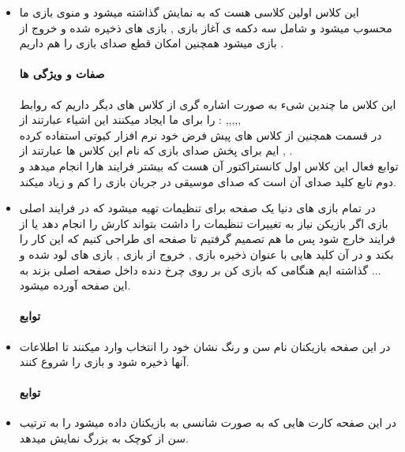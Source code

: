 \documentclass[pdf,titlepage,a4paper]{report}
\begin{document}
\begin{itemize}
		\item {}  این کلاس اولین کلاسی هست که به نمایش گذاشته میشود و منوی بازی ما محسوب میشود و شامل سه دکمه ی آغاز بازی , بازی های ذخیره شده و خروج از بازی میشود همچنین امکان قطع صدای بازی را هم داریم .\\
		\paragraph{صفات و ویژگی ها} 
         این کلاس ما چندین شیء به صورت اشاره گری از کلاس های دیگر داریم که روابط را برای ما ایجاد میکنند این اشیاء عبارتند از :
		,,,,, \\ در قسمت
		همچنین از کلاس های پیش فرض خود نرم افزار کیوتی استفاده کرده ایم برای پخش صدای بازی که نام این کلاس ها عبارتند از 
		,  . \\
		 توابع فعال این کلاس اول کانستراکتور آن هست که بیشتر فرایند هارا انجام میدهد و دوم تابع کلید صدای آن است که صدای موسیقی در جریان بازی را کم و زیاد میکند.\\
		
		\item {}  در تمام بازی های دنیا یک صفحه برای تنظیمات تهیه میشود که در فرایند اصلی بازی اگر بازیکن نیاز به تغییرات تنظیمات را داشت بتواند کارش را انجام دهد یا از فرایند خارج شود پس ما هم تصمیم گرفتیم تا صفحه ای طراحی کنیم که این کار را بکند و در آن کلید هایی با عنوان ذخیره بازی , خروج از بازی ,  بازی های لود شده و ... گذاشته ایم هنگامی که بازی کن بر روی چرخ دنده داخل صفحه اصلی بزند به این صفحه آورده میشود. \\
		\paragraph{توابع} 

		\item {}   در این صفحه بازیکنان نام سن و رنگ نشان خود را انتخاب وارد میکنند تا اطلاعات آنها ذخیره شود و بازی را شروع کنند.\\
		\paragraph{توابع} 

		\item {}  در این صفحه کارت هایی که به صورت شانسی به بازیکنان داده میشود را به ترتیب سن از کوچک به بزرگ نمایش میدهد.\\

\end{itemize}
\end{document}
